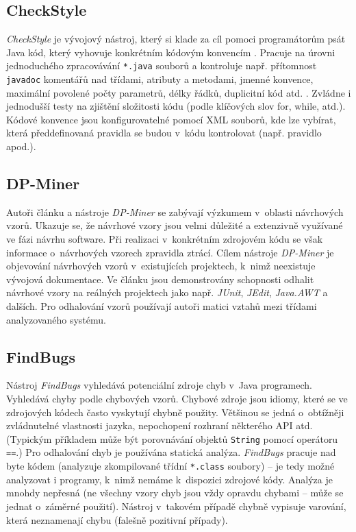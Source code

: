 \subsection{CheckStyle}
\emph{CheckStyle} je vývojový nástroj, který si klade za cíl pomoci programátorům psát Java kód, který vyhovuje konkrétním kódovým konvencím \cite{existingtools:checkstyle}. Pracuje na úrovni jednoduchého zpracovávání \verb+*.java+ souborů a kontroluje např. přítomnost \verb+javadoc+ komentářů nad třídami, atributy a metodami, jmenné konvence, maximální povolené počty parametrů, délky řádků, duplicitní kód atd. \cite{existingtools:checkstyle-wiki}. Zvládne i jednodušší testy na zjištění složitosti kódu (podle klíčových slov for, while, atd.). Kódové konvence jsou konfigurovatelné pomocí XML souborů, kde lze vybírat, která předdefinovaná pravidla se budou v~kódu kontrolovat (např. pravidlo \mbox{} apod.).

\subsection{DP-Miner}
Autoři článku \cite{4273268} a nástroje \emph{DP-Miner} \cite{existingtools:dp-miner} se zabývají výzkumem v~oblasti návrhových vzorů. Ukazuje se, že návrhové vzory jsou velmi důležité a extenzivně využívané ve fázi návrhu software. Při realizaci v~konkrétním zdrojovém kódu se však informace o~návrhových vzorech zpravidla ztrácí. Cílem nástroje \emph{DP-Miner} je objevování návrhových vzorů v~existujících projektech, k~nimž neexistuje vývojová dokumentace. Ve článku \cite{4273268} jsou demonstrovány schopnosti odhalit návrhové vzory na reálných projektech jako např. \emph{JUnit}, \emph{JEdit}, \emph{Java.AWT} a dalších. Pro odhalování vzorů používají autoři matici vztahů mezi třídami analyzovaného systému.

\subsection{FindBugs}
Nástroj \emph{FindBugs} \cite{existingtools:findbugs} vyhledává potenciální zdroje chyb v~Java programech. Vyhledává chyby podle chybových vzorů. Chybové zdroje jsou idiomy, které se ve zdrojových kódech často vyskytují chybně použity. Většinou se jedná o~obtížněji zvládnutelné vlastnosti jazyka, nepochopení rozhraní některého API atd. (Typickým příkladem může být porovnávání objektů \verb+String+ pomocí operátoru \verb+==+.) Pro odhalování chyb je používána statická analýza. \emph{FindBugs} pracuje nad byte kódem (analyzuje zkompilované třídní \verb-*.class- soubory) -- je tedy možné analyzovat i programy, k~nimž nemáme k~dispozici zdrojové kódy. Analýza je mnohdy nepřesná (ne všechny vzory chyb jsou vždy opravdu chybami -- může se jednat o~záměrné použití). Nástroj v~takovém případě chybně vypisuje varování, která neznamenají chybu (falešně pozitivní případy).

